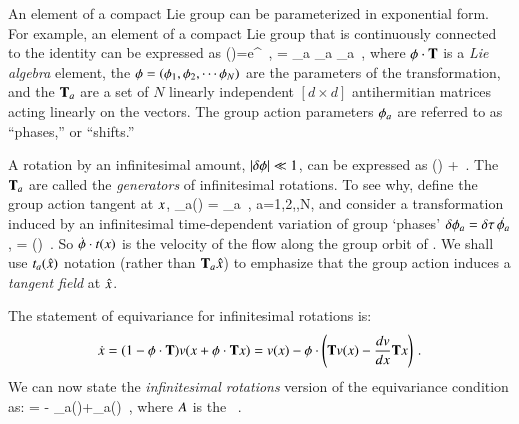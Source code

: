 An element of a compact Lie group can be parameterized in exponential form.
For example, an element of a compact Lie group that is continuously connected to the identity can be expressed as
\beq
\LieEl(\gSpace)=e^{{\gSpace} \cdot \Lg }
    \,,\qquad
\gSpace \cdot \Lg = \sum_a \gSpace_a \Lg_a
\,,
	\toCB
where $\gSpace \cdot \Lg $ is a \emph{Lie algebra} element, the $\gSpace = (\gSpace_1,\gSpace_2,\cdots\gSpace_N)$ are the parameters of the transformation, and the $\Lg_a$ are a set of $N$ linearly independent $[d\!\times\!d]$ antihermitian matrices acting linearly on the {\statesp} vectors. The group action parameters $\gSpace_a$ are referred to as ``phases,'' or ``shifts.''
%

A rotation by an infinitesimal amount, $|\delta \gSpace| \ll 1$, can be  expressed as
\beq
\LieEl(\delta \gSpace)  + \delta \gSpace \cdot \Lg
	\,.
The $\Lg_a$  are called the \emph{generators} of infinitesimal rotations. To see why, define the group action tangent at $\ssp$,
\beq
 \groupTan_{a}(\ssp) = \Lg _{a} \ssp
    \,,\qquad
 a=1,2,\cdots,N,
and consider a transformation induced by an infinitesimal
time-dependent variation of group `phases'
$\delta \gSpace_a = \timeStep \, \dot{\gSpace_a}$,
\beq
\dot{\ssp} = \dot{\gSpace} \cdot \groupTan(\ssp)
\,.
So $\dot{\gSpace} \cdot \groupTan(\ssp)$ is the velocity
of the flow along the group orbit of \ssp.
We shall use $\groupTan_a(\sspRed)$ notation (rather than
$\Lg_{a}\sspRed$) to emphasize that the group action
induces a \emph{tangent field} at $\sspRed$.

The statement of equivariance
 for infinitesimal rotations is:
\[
\dot{x}=(1-\gSpace \cdot \Lg ) \vel(x+\gSpace \cdot \Lg  x)
       =\vel(x)-\gSpace \cdot \left(
            \Lg \vel(x) - \frac{d\vel}{dx} \Lg x
                     \right)
\,.
\]
We can now state the {\em infinitesimal
rotations} version of the equivariance condition
 as:
 = - \groupTan_{a}(\vel)+\Mvar \groupTan_{a}(\ssp)
\,,
\label{eq:InfnmslRot}
\eeq
where $A$ is the \stabmat\ .

